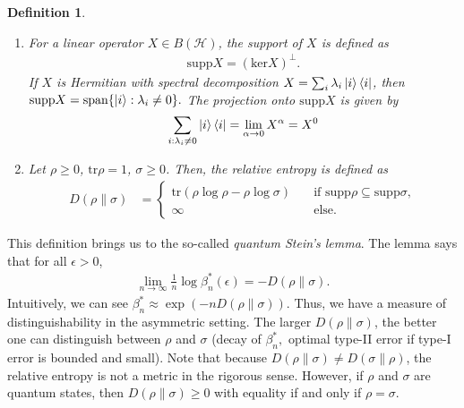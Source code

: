 \documentclass[notoc]{tufte-book}
\newtheorem{definition}[theorem]{Definition}
\begin{document}
\begin{tcolorbox}[colframe=white,breakable, colback=black!5, arc=0pt, outer arc=0pt]
\begin{definition}
\begin{enumerate}
    \item For a linear operator $X\in B(\mathcal{H})$, the support of $X$ is defined as 
    \begin{align}
        \text{supp}X = (\text{ker} X)^{\perp}.
    \end{align}
    If $X$ is Hermitian with spectral decomposition $X=\sum_i \lambda_i \ket{i}\bra{i}$, then $\text{supp}X=\text{span}\{\ket{i}: \lambda_i \neq 0\}.$ The projection onto $\text{supp}X$ is given by
    \begin{align}
        \sum_{i:\lambda_i \neq 0} \ket{i}\bra{i} = \lim_{\alpha \rightarrow 0} X^{\alpha} = X^{0}
    \end{align}
    \item Let $\rho \geq 0$, $\text{tr}\rho = 1$, $\sigma \geq 0$. Then, the \textit{relative entropy} is defined as 
    \begin{align}\label{eq:relative-entropy}
        D(\rho \| \sigma) &= \begin{cases}
        \text{tr}(\rho \log{\rho} - \rho \log{\sigma}) \quad &\text{if } \text{supp}\rho \subseteq \text{supp}\sigma, \\
        \infty \quad &\text{else}.
        \end{cases}
    \end{align}
\end{enumerate}
\end{definition}
\end{tcolorbox}

This definition brings us to the so-called \textit{quantum Stein's lemma}. The lemma says that for all $\epsilon > 0$, 
\begin{align}
    \lim_{n\rightarrow \infty} \frac{1}{n} \log{\beta_n^{*} (\epsilon)} = - D(\rho \| \sigma).
\end{align}
Intuitively, we can see $\beta_n^{*} \approx \exp{(-n D(\rho \| \sigma))}$. Thus, we have a measure of distinguishability in the asymmetric setting. The larger $D(\rho \| \sigma)$, the better one can distinguish between $\rho$ and $\sigma$ (decay of $\beta^*_n,$ optimal type-II error if type-I error is bounded and small). Note that because $D(\rho \| \sigma) \neq D(\sigma \| \rho)$, the relative entropy is not a metric in the rigorous sense. However, if $\rho$ and $\sigma$ are quantum states, then $D(\rho \| \sigma) \geq 0$ with equality if and only if $\rho=\sigma$.
\end{document}
